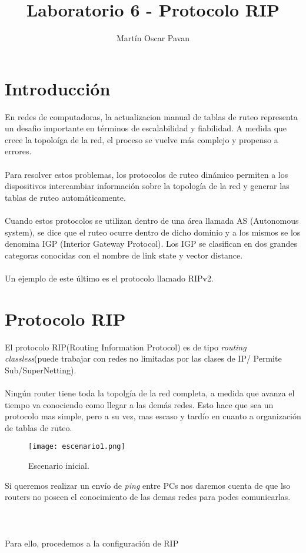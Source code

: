 \documentclass{article}
\title{Laboratorio 6 - Protocolo RIP}
\author{Martín Oscar Pavan}
\begin{document}
\maketitle
\section{Introducción}
En redes de computadoras, la actualizacion manual de tablas de ruteo representa un desafio importante en términos de escalabilidad y fiabilidad. A medida que crece la topoloíga de la red, el proceso se vuelve más complejo y propenso a errores.
\\\\
Para resolver estos problemas, los protocolos de ruteo dinámico permiten a los dispositivos intercambiar información sobre la topología de la red y generar las tablas de ruteo automáticamente.
\\\\
Cuando estos protocolos se utilizan dentro de una área llamada AS (Autonomous system), se dice que el ruteo ocurre dentro de dicho dominio y a los mismos se los denomina IGP (Interior Gateway Protocol).
Los IGP se clasifican en dos grandes categoras conocidas con el nombre de link state y vector distance. 
\\\\
Un ejemplo de este último es el protocolo llamado RIPv2.

\section{Protocolo RIP}
El protocolo RIP(Routing Information Protocol) es de tipo \textit{routing classless}(puede trabajar con redes no limitadas por las clases de IP/ Permite Sub/SuperNetting).
\\\\
Ningún router tiene toda la topolgía de la red completa, a medida que avanza el tiempo va conociendo como llegar a las demás redes. Esto hace que sea un protocolo mas simple, pero a su vez, mas escaso y tardío en cuanto a organización de tablas de ruteo.
\begin{figure}[H]
    \centering
    \texttt{[image: escenario1.png]}
    \caption{Escenario inicial.}
    \label{fig:enter-label}
\end{figure}
Si queremos realizar un envío de \textit{ping} entre PCs nos daremos cuenta de que lso routers no poseen el conocimiento de las demas redes para podes comunicarlas.
\\\\\\\\
Para ello, procedemos a la configuración de RIP
\end{document}
